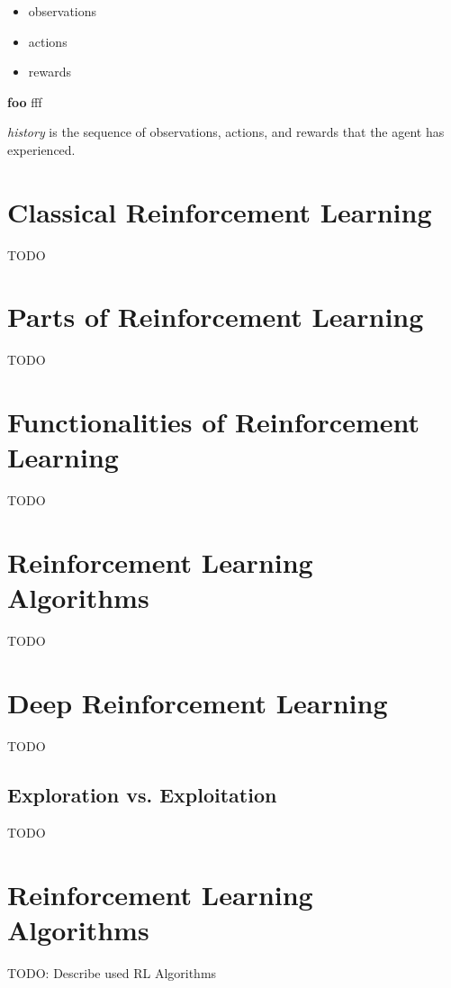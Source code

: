 \begin{itemize}
    \item observations
    \item actions
    \item rewards
\end{itemize}

\textbf{foo}
\textrm{fff}


\begin{definition}
    \textit{history} is the sequence of observations, actions, and rewards that the agent has experienced.
\end{definition}


\section{Classical Reinforcement Learning}\label{sec:classical-reinforcement-learning}
TODO


\section{Parts of Reinforcement Learning}\label{sec:parts-of-reinforcement-learning}
TODO


\section{Functionalities of Reinforcement Learning}\label{sec:functionalities-of-reinforcement-learning}
TODO


\section{Reinforcement Learning Algorithms}\label{sec:reinforcement-learning-algorithms2}
TODO


\section{Deep Reinforcement Learning}\label{sec:deep-reinforcement-learning}
TODO

\subsection{Exploration vs. Exploitation}\label{subsec:exploration-vs.-exploitation}
TODO


\section{Reinforcement Learning Algorithms}\label{sec:reinforcement-learning-algorithms}
TODO: Describe used RL Algorithms

